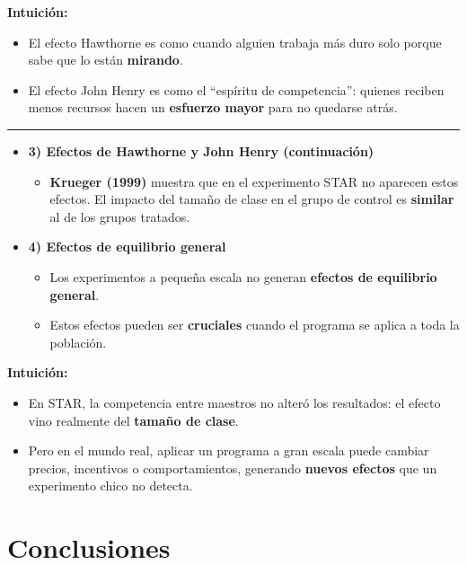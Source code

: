 \documentclass[12pt]{article}
\begin{document}
\textbf{Intuición:}
\begin{itemize}
    \item El efecto Hawthorne es como cuando alguien trabaja más duro solo porque sabe que lo están \textbf{mirando}.
    \item El efecto John Henry es como el “espíritu de competencia”: quienes reciben menos recursos hacen un \textbf{esfuerzo mayor} para no quedarse atrás.
\end{itemize}

\hrule

\begin{itemize}
    \item \textbf{3) Efectos de Hawthorne y John Henry (continuación)}  
    \begin{itemize}
        \item \textbf{Krueger (1999)} muestra que en el experimento STAR no aparecen estos efectos.  
        El impacto del tamaño de clase en el grupo de control es \textbf{similar} al de los grupos tratados.
    \end{itemize}
    \item \textbf{4) Efectos de equilibrio general}  
    \begin{itemize}
        \item Los experimentos a pequeña escala no generan \textbf{efectos de equilibrio general}.  
        \item Estos efectos pueden ser \textbf{cruciales} cuando el programa se aplica a toda la población.
    \end{itemize}
\end{itemize}

\textbf{Intuición:}
\begin{itemize}
    \item En STAR, la competencia entre maestros no alteró los resultados: el efecto vino realmente del \textbf{tamaño de clase}.
    \item Pero en el mundo real, aplicar un programa a gran escala puede cambiar precios, incentivos o comportamientos, generando \textbf{nuevos efectos} que un experimento chico no detecta.
\end{itemize}


\section*{\noindent\textbf{Conclusiones}}
\end{document}
